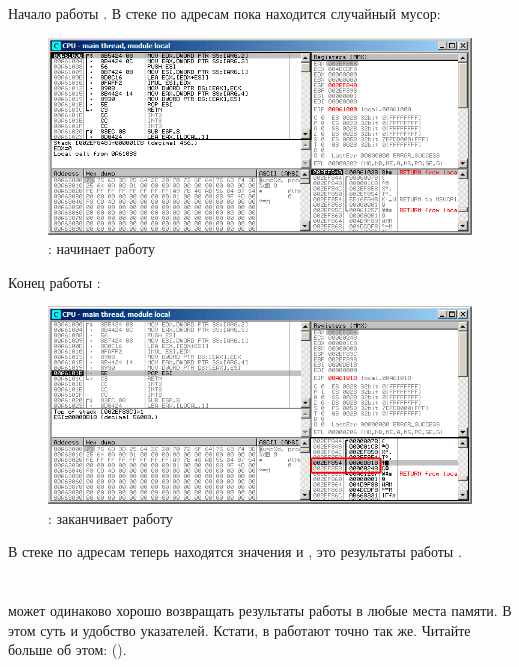 \clearpage
Начало работы \ttfone.
В стеке по адресам \PtrsAddresses пока находится случайный мусор:

\begin{figure}[H]
\centering
\includegraphics[scale=\FigScale]{patterns/061_pointers/olly_stk2.png}
\caption{\olly: \ttfone начинает работу}
\label{fig:pointers_olly_stk_2}
\end{figure}

\clearpage
Конец работы \ttfone:

\begin{figure}[H]
\centering
\includegraphics[scale=\FigScale]{patterns/061_pointers/olly_stk3.png}
\caption{\olly: \ttfone заканчивает работу}
\label{fig:pointers_olly_stk_3}
\end{figure}

В стеке по адресам \PtrsAddresses теперь находятся значения  и , это результаты работы \ttfone.

\section{\Conclusion{}}

\ttfone может одинаково хорошо возвращать результаты работы в любые места памяти. 
В этом суть и удобство указателей.
Кстати,  в \Cpp работают точно так же. Читайте больше об этом: ().

